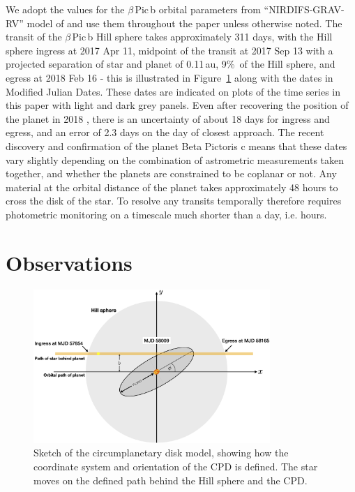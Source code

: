 \documentclass[longauth]{aa} %
\newcommand{\bpb}{$\beta$\,Pic\,b}
\begin{document}
We adopt the values for the \bpb{} orbital parameters from ``NIRDIFS-GRAV-RV'' model of \citet{Lagrange20} and use them throughout the paper unless otherwise noted.
%
The transit of the \bpb{} Hill sphere takes approximately 311 days, with the Hill sphere ingress at 2017 Apr 11, midpoint of the transit at 2017 Sep 13 with a projected separation of star and planet of 0.11\,au, 9\%\, of the Hill sphere, and egress at 2018 Feb 16 - this is illustrated in Figure~\ref{cpdmodel} along with the dates in Modified Julian Dates.
%
These dates are indicated on plots of the time series in this paper with light and dark grey panels.
%
Even after recovering the position of the planet in 2018 \citep{Lagrange19}, there is an uncertainty of about 18 days for ingress and egress, and an error of 2.3 days on the day of closest approach.
%
The recent discovery and confirmation of the planet Beta Pictoris c \citep{Lagrange20,Nowak20} means that these dates vary slightly depending on the combination of astrometric measurements taken together, and whether the planets are constrained to be coplanar or not.
%
Any material at the orbital distance of the planet takes approximately 48 hours to cross the disk of the star.
%
To resolve any transits temporally therefore requires photometric monitoring on a timescale much shorter than a day, i.e. hours.

\section{Observations}\label{sec:obs}

\begin{figure}[htb]
\centering
\includegraphics[width=0.8\textwidth]{disk_sketch.jpg}
\caption{Sketch of the circumplanetary disk model, showing how the coordinate system and orientation of the CPD is defined. The star moves on the defined path behind the Hill sphere and the CPD.}
\label{cpdmodel}
\end{figure}
\end{document}
